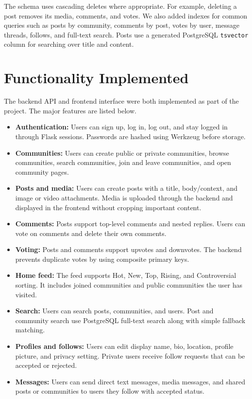 \documentclass[11pt]{article}
\begin{document}
The schema uses cascading deletes where appropriate. For example, deleting a post removes its media, comments, and votes. We also added indexes for common queries such as posts by community, comments by post, votes by user, message threads, follows, and full-text search. Posts use a generated PostgreSQL \texttt{tsvector} column for searching over title and content.

\section{Functionality Implemented}

The backend API and frontend interface were both implemented as part of the project. The major features are listed below.

\begin{itemize}
    \item \textbf{Authentication:} Users can sign up, log in, log out, and stay logged in through Flask sessions. Passwords are hashed using Werkzeug before storage.
    \item \textbf{Communities:} Users can create public or private communities, browse communities, search communities, join and leave communities, and open community pages.
    \item \textbf{Posts and media:} Users can create posts with a title, body/context, and image or video attachments. Media is uploaded through the backend and displayed in the frontend without cropping important content.
    \item \textbf{Comments:} Posts support top-level comments and nested replies. Users can vote on comments and delete their own comments.
    \item \textbf{Voting:} Posts and comments support upvotes and downvotes. The backend prevents duplicate votes by using composite primary keys.
    \item \textbf{Home feed:} The feed supports Hot, New, Top, Rising, and Controversial sorting. It includes joined communities and public communities the user has visited.
    \item \textbf{Search:} Users can search posts, communities, and users. Post and community search use PostgreSQL full-text search along with simple fallback matching.
    \item \textbf{Profiles and follows:} Users can edit display name, bio, location, profile picture, and privacy setting. Private users receive follow requests that can be accepted or rejected.
    \item \textbf{Messages:} Users can send direct text messages, media messages, and shared posts or communities to users they follow with accepted status.
\end{itemize}
\end{document}
